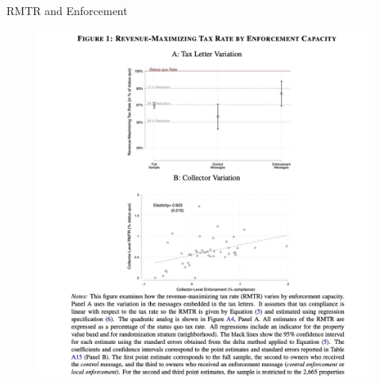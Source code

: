 \documentclass{beamer}
\begin{document}
\begin{frame}{RMTR and Enforcement}
\begin{figure}
    \centering
    \includegraphics[height=\textheight,width=\textwidth]{Paper Presentations/The State Capacity Ceiling on Tax Rates/F1.png}
    \label{fig:enter-label}
\end{figure}
\end{frame}
\end{document}
